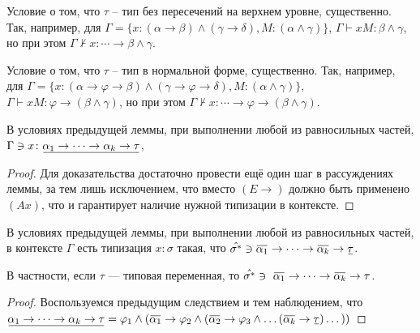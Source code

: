 \documentclass{spbau-diploma}
\begin{document}
\begin{notice}
    Условие о том, что $\tau$ -- тип без пересечений на верхнем уровне, существенно. Так, например, для $\Gamma = \{x \colon (\alpha \to \beta) \wedge (\gamma \to \delta), M \colon (\alpha \wedge \gamma)  \}$, $\Gamma \vdash xM \colon \beta \wedge \gamma$, но при этом $\Gamma \nvdash x \colon \cdots \to \beta \wedge \gamma$.
\end{notice}

\begin{notice}
    Условие о том, что $\tau$ -- тип в нормальной форме, существенно. Так, например, для $\Gamma = \{x \colon (\alpha \to \varphi \to \beta) \wedge (\gamma \to \varphi \to \delta), M \colon (\alpha \wedge \gamma)  \}$, $\Gamma \vdash xM \colon \varphi \to (\beta \wedge \gamma)$, но при этом $\Gamma \nvdash x \colon \cdots \to \varphi \to (\beta \wedge \gamma)$.
\end{notice}

\begin{corollary} \label{в контексте} 
    В условиях предыдущей леммы, при выполнении любой из равносильных частей, $\Gamma \ni x \colon \ub{\alpha_1 \to \cdots \to \alpha_k \to \tau}$,
\end{corollary}

\begin{proof}
Для доказательства достаточно провести ещё один шаг в рассуждениях леммы, за тем лишь исключением, что вместо $(E \to)$ должно быть применено $(Ax)$, что и гарантирует наличие нужной типизации в контексте.
\end{proof}

\begin{corollary} \label{в контексте при разложении}
    В условиях предыдущей леммы, при выполнении любой из равносильных частей, в контексте $\Gamma$ есть типизация $x \colon \sigma$ такая, что $\hat{\sigma^*} \ni \ob{\alpha_1} \to \cdots \to \ob{\alpha_k} \to \ub{\tau}$.
    
    В частности, если $\tau$ --- типовая переменная, то $\hat{\sigma^*} \ni \ \ob{\alpha_1} \to \cdots \to \ob{\alpha_k}  \to \tau$.
\end{corollary}
\begin{proof}
    Воспользуемся предыдущим следствием и тем наблюдением, что 
    $\ub{\alpha_1 \to \cdots \to \alpha_k \to \tau} = \varphi_1 \wedge (\ob{\alpha_1} \to \varphi_2 \wedge (\ob{\alpha_2} \to \varphi_3 \wedge \dots(\ob{\alpha_k} \to  \ub{\tau})\dots))$
\end{proof}
\end{document}
